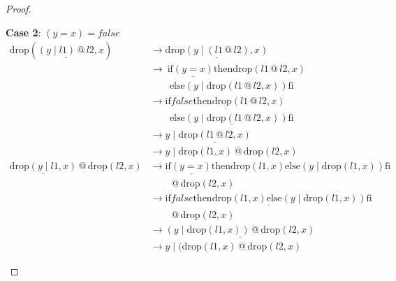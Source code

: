 \documentclass[12pt, a4paper]{article}
\newcommand{\rel}[1]{\mathrel{#1}}
\newcommand{\rmx}[1]{\mathrm{#1}}
\newcommand{\larrow}{\longrightarrow}
\newcommand{\under}{\underline}
\begin{document}
\begin{proof}
\begin{description}
\textbf{Case 2}: $(y = x) = false$
\begin{align*}
\rmx{drop}(\under{(y \rel{|} l1) \rel{@} l2}, x)
	&\larrow \under{\rmx{drop}(y \rel{|} (l1 \rel{@} l2), x)} \tag{by @2} \\
	&\larrow\ \rel{\rmx{if}} \under{(y = x)} \rel{\rmx{then}} \rmx{drop}(l1 \rel{@} l2, x) \\
	&\quad \quad \rel{\rmx{else}} (y \rel{|} \rmx{drop}(l1 \rel{@} l2, x)) \rel{\rmx{fi}} \tag{by drop2} \\
	&\larrow \under{\rel{\rmx{if}} false \rel{\rmx{then}} \rmx{drop}(l1 \rel{@} l2, x)} \\
	&\quad \quad \under{\rel{\rmx{else}} (y \rel{|} \rmx{drop}(l1 \rel{@} l2, x)) \rel{\rmx{fi}}} \tag{by case splitting} \\
	&\larrow y \rel{|} \under{\rmx{drop}(l1 \rel{@} l2, x)} \tag{by if2} \\
	&\larrow y \rel{|} \rmx{drop}(l1, x) \rel{@} \rmx{drop}(l2, x) \tag{by IH} \\
\under{\rmx{drop}(y \rel{|} l1, x)} \rel{@} \rmx{drop}(l2, x)
	&\larrow \rel{\rmx{if}} \under{(y = x)} \rel{\rmx{then}} \rmx{drop}(l1, x) \rel{\rmx{else}} (y \rel{|} \rmx{drop}(l1, x)) \rel{\rmx{fi}} \\
	&\quad \quad \rel{@} \rmx{drop}(l2, x) \tag{by drop2} \\
	&\larrow \under{\rel{\rmx{if}} false \rel{\rmx{then}} \rmx{drop}(l1, x) \rel{\rmx{else}} (y \rel{|} \rmx{drop}(l1, x)) \rel{\rmx{fi}}} \\
	&\quad \quad \rel{@} \rmx{drop}(l2, x) \tag{by case splitting} \\
	&\larrow \under{(y \rel{|} \rmx{drop}(l1, x)) \rel{@} \rmx{drop}(l2, x)} \tag{by if2} \\
	&\larrow y \rel{|} (\rmx{drop}(l1, x) \rel{@} \rmx{drop}(l2, x) \tag{by @2}
\end{align*}
\end{description}
\end{proof}
\end{document}
